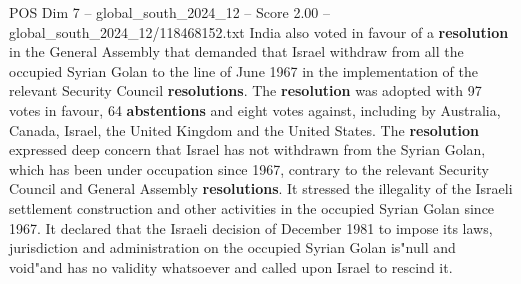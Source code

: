 \begin{textsample}{POS Dim 7 – global\_south\_2024\_12 – Score 2.00 – global\_south\_2024\_12/118468152.txt}
India also voted in favour of a \textbf{resolution} in the General Assembly that demanded that Israel withdraw from all the occupied Syrian Golan to the line of June 1967 in the implementation of the relevant Security Council \textbf{resolutions}.
The \textbf{resolution} was adopted with 97 votes in favour, 64 \textbf{abstentions} and eight votes against, including by Australia, Canada, Israel, the United Kingdom and the United States.
The \textbf{resolution} expressed deep concern that Israel has not withdrawn from the Syrian Golan, which has been under occupation since 1967, contrary to the relevant Security Council and General Assembly \textbf{resolutions}.
It stressed the illegality of the Israeli settlement construction and other activities in the occupied Syrian Golan since 1967.
It declared that the Israeli decision of December 1981 to impose its laws, jurisdiction and administration on the occupied Syrian Golan is"null and void"and has no validity whatsoever and called upon Israel to rescind it.

\end{textsample}
